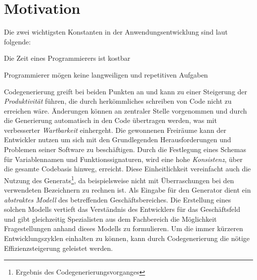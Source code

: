 \section{Motivation}
\label{sec:motivation}

Die zwei wichtigsten Konstanten in der Anwendungsentwicklung sind laut \parencite{herrington2003code} folgende:
\begin{compactitem}
    \item Die Zeit eines Programmierers ist kostbar
    \item Programmierer mögen keine langweiligen und repetitiven Aufgaben
\end{compactitem}
Codegenerierung greift bei beiden Punkten an und kann zu einer Steigerung der \emph{Produktivität} führen, die durch herkömmliches schreiben von Code nicht zu erreichen wäre. 
Änderungen können an zentraler Stelle vorgenommen und durch die Generierung automatisch in den Code übertragen werden, was mit verbesserter \emph{Wartbarkeit} einhergeht.
Die gewonnenen Freiräume kann der Entwickler nutzen um sich mit den Grundlegenden Herausforderungen und Problemen seiner Software zu beschäftigen.
Durch die Festlegung eines Schemas für Variablennamen und Funktionssignaturen, wird eine hohe \emph{Konsistenz}, über die gesamte Codebasis hinweg, erreicht.
Diese Einheitlichkeit vereinfacht auch die Nutzung des Generats\footnote{Ergebnis des Codegenerierungsvorganges}, da beispielsweise nicht mit Überraschungen bei den verwendeten Bezeichnern zu rechnen ist.
Als Eingabe für den Generator dient ein \emph{abstraktes Modell} des betreffenden Geschäftsbereiches. Die Erstellung eines solchen Modells vertieft das Verständnis des Entwicklers für das Geschäftsfeld und gibt gleichzeitig Spezialisten aus dem Fachbereich die Möglichkeit Fragestellungen anhand dieses Modells zu formulieren.
Um die immer kürzeren Entwicklungszyklen einhalten zu können, kann durch Codegenerierung die nötige Effizienzsteigerung geleistet werden.